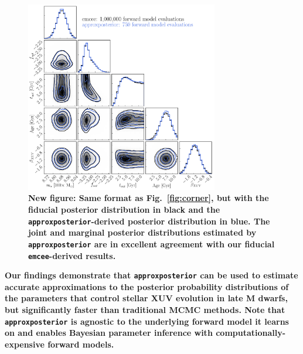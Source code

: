 \documentclass[twocolumn]{aastex62}
\newcommand{\xxx}[1]{{\textbf{#1}}}
\newcommand{\emcee}[0]{\texttt{emcee}\xspace}
\newcommand{\approxposterior}[0]{\texttt{approxposterior}\xspace}
\begin{document}
\begin{figure}
\centering
	\includegraphics[width=0.75\textwidth]{../Analysis/Approx/stacked.pdf}
   \caption{\xxx{New figure: Same format as Fig.~\ref{fig:corner}, but with the fiducial posterior distribution in black and the \approxposterior-derived posterior distribution in blue. \textbf{The joint and marginal posterior distributions estimated by \approxposterior are in excellent agreement with our fiducial \emcee-derived results.}}}%
    \label{fig:stacked}%
\end{figure}

\xxx{Our findings demonstrate that \approxposterior can be used to estimate accurate approximations to the posterior probability distributions of the parameters that control stellar XUV evolution in late M dwarfs, but significantly faster than traditional MCMC methods. Note that \approxposterior is agnostic to the underlying forward model it learns on and enables Bayesian parameter inference with computationally-expensive forward models.}

\end{document}
